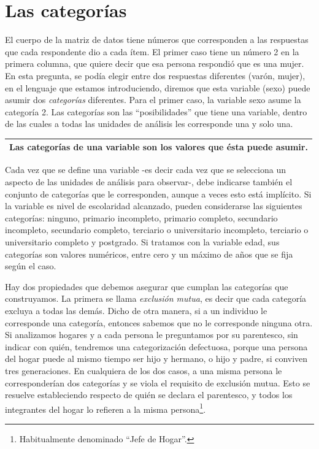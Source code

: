 \documentclass[]{book}
\let\rmarkdownfootnote\footnote%
\def\footnote{\protect\rmarkdownfootnote}
\begin{document}
\hypertarget{las-categoruxedas}{%
\section{Las categorías}\label{las-categoruxedas}}

El cuerpo de la matriz de datos tiene números que corresponden a las respuestas que cada respondente dio a cada ítem. El primer caso tiene un número 2 en la primera columna, que quiere decir que esa persona respondió que es una mujer. En esta pregunta, se podía elegir entre dos respuestas diferentes (varón, mujer), en el lenguaje que estamos introduciendo, diremos que esta variable (sexo) puede asumir dos \emph{categorías} diferentes. Para el primer caso, la variable sexo asume la categoría 2. Las categorías son las ``posibilidades'' que tiene una variable, dentro de las cuales a todas las unidades de análisis les corresponde una y solo una.

\begin{longtable}[]{@{}c@{}}
\toprule
\endhead
Las \textbf{categorías} de una variable son los valores que ésta puede asumir.\tabularnewline
\bottomrule
\end{longtable}

Cada vez que se define una variable -es decir cada vez que se selecciona un aspecto de las unidades de análisis para observar-, debe indicarse también el conjunto de categorías que le corresponden, aunque a veces esto está implícito. Si la variable es nivel de escolaridad alcanzado, pueden considerarse las siguientes categorías: ninguno, primario incompleto, primario completo, secundario incompleto, secundario completo, terciario o universitario incompleto, terciario o universitario completo y postgrado. Si tratamos con la variable edad, sus categorías son valores numéricos, entre cero y un máximo de años que se fija según el caso.

Hay dos propiedades que debemos asegurar que cumplan las categorías que construyamos. La primera se llama \emph{exclusión mutua}, es decir que cada categoría excluya a todas las demás. Dicho de otra manera, si a un individuo le corresponde una categoría, entonces sabemos que no le corresponde ninguna otra. Si analizamos hogares y a cada persona le preguntamos por su parentesco, sin indicar con quién, tendremos una categorización defectuosa, porque una persona del hogar puede al mismo tiempo ser hijo y hermano, o hijo y padre, si conviven tres generaciones. En cualquiera de los dos casos, a una misma persona le corresponderían dos categorías y se viola el requisito de exclusión mutua. Esto se resuelve estableciendo respecto de quién se declara el parentesco, y todos los integrantes del hogar lo refieren a la misma persona\footnote{Habitualmente denominado ``Jefe de Hogar''.}.
\end{document}
